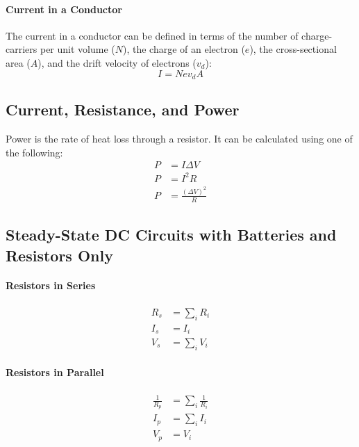 \documentclass{article}
\begin{document}
            \paragraph{Current in a Conductor}
            The current in a conductor can be defined in terms of the number of charge-carriers per unit volume ($N$), the charge of an electron ($e$), the cross-sectional area ($A$), and the drift velocity of electrons ($v_d$):
            \begin{equation}
                I = N e v_d A
            \end{equation}

        \subsection{Current, Resistance, and Power}
            Power is the rate of heat loss through a resistor. It can be calculated using one of the following:
            \begin{align}
                P &= I \Delta V \\
                P &= I^2 R \\
                P &= \frac{\left( \Delta V \right)^2}{R}
            \end{align}

        \subsection{Steady-State DC Circuits with Batteries and Resistors Only}
            \paragraph{Resistors in Series}
            \begin{align}
                R_s &= \sum_i R_i \\
                I_s &= I_i \\
                V_s &= \sum_i V_i
            \end{align}

            \paragraph{Resistors in Parallel}
            \begin{align}
                \frac{1}{R_p} &= \sum_i \frac{1}{R_i} \\
                I_p &= \sum_i I_i \\
                V_p &= V_i
            \end{align}
\end{document}
